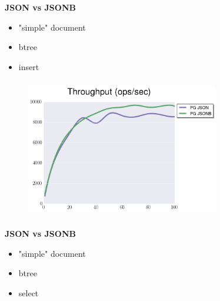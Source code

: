 \documentclass[usenames,dvipsnames, 18pt, compress, aspectratio=169]{beamer}
\begin{document}

\begin{frame}
    \frametitle{}
    \begin{center}
        \textbf{JSON vs JSONB}
        \begin{itemize}[label={}]
            \item "simple" document
            \item btree
            \item insert
        \end{itemize}
    \end{center}
\end{frame}

\begin{frame}
    \frametitle{}
    \begin{center}
    \begin{figure}
        \includegraphics[width=0.75\textwidth,center]{benchmarks/postgresql_load_json_jsonb.png}
    \end{figure}
    \end{center}
\end{frame}

\begin{frame}
    \frametitle{}
    \begin{center}
        \textbf{JSON vs JSONB}
        \begin{itemize}[label={}]
            \item "simple" document
            \item btree
            \item select
        \end{itemize}
    \end{center}
\end{frame}
\end{document}
